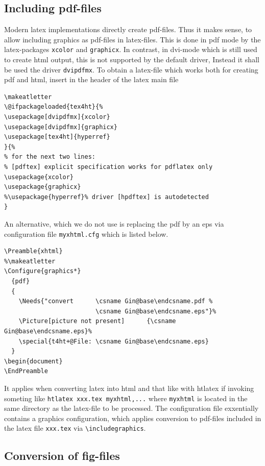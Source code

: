 \documentclass[12pt]{article}
\begin{document}
\subsection{Including pdf-files}\label{subsec:figpdf}

Modern latex implementations directly create pdf-files. 
Thus it makes sense, to allow including graphics as pdf-files 
in latex-files. 
This is done in pdf mode 
by the latex-packages {\tt xcolor} and {\tt graphicx}. 
In contrast, in dvi-mode which is still used to create html output, 
this is not supported by the default driver, 
Instead it shall be used the driver {\tt dvipdfmx}. 
To obtain a latex-file which works both for creating pdf and html, 
insert in the header of the latex main file 
%
\lstset{language=tex, basicstyle=\small}
\begin{lstlisting}
\makeatletter
\@ifpackageloaded{tex4ht}{%
\usepackage[dvipdfmx]{xcolor}
\usepackage[dvipdfmx]{graphicx}
\usepackage[tex4ht]{hyperref}
}{%
% for the next two lines: 
% [pdftex] explicit specification works for pdflatex only 
\usepackage{xcolor}
\usepackage{graphicx}
%\usepackage{hyperref}% driver [hpdftex] is autodetected 
}
\end{lstlisting}

An alternative, which we do not use 
is replacing the pdf by an eps via configuration file {\tt myxhtml.cfg} 
which is listed below. 
%
\lstset{language=tex, basicstyle=\scriptsize}
\begin{lstlisting}
\Preamble{xhtml}
%\makeatletter
\Configure{graphics*}  
  {pdf}  
  {
    \Needs{"convert      \csname Gin@base\endcsname.pdf %
                         \csname Gin@base\endcsname.eps"}%  
    \Picture[picture not present]      {\csname Gin@base\endcsname.eps}%  
    \special{t4ht+@File: \csname Gin@base\endcsname.eps}
  }
\begin{document}
\EndPreamble

\end{lstlisting}
%
It applies when converting latex into html and that like 
with htlatex if invoking someting like {\tt htlatex xxx.tex myxhtml,...} 
where {\tt myxhtml} is located in the same directory as the latex-file 
to be processed. 
The configuration file exxentially contains a graphics configuration, 
which applies conversion to pdf-files included in the latex file {\tt xxx.tex}
via {\tt \textbackslash includegraphics}. 


\subsection{Conversion of fig-files}\label{subsec:fig2dev}
\end{document}
